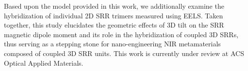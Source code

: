 \documentclass[12pt]{article}
\begin{document}
Based upon the model provided in this work, we additionally examine the 
hybridization of individual 2D SRR trimers measured using EELS. 
Taken together, this study elucidates the geometric effects of 3D tilt on 
the SRR magnetic dipole moment and its role in the hybridization of 
coupled 3D SRRs, thus serving as a stepping stone for nano-engineering 
NIR metamaterials composed of coupled 3D SRR units. This work is currently 
under review at ACS Optical Applied Materials.


\newpage


\end{document}
